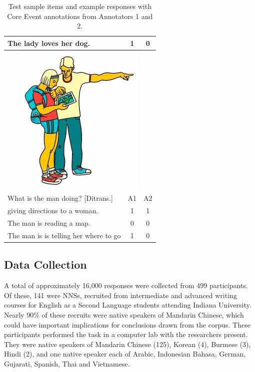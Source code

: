 \documentclass[11pt,a4paper]{article}
\begin{document}
\begin{table}[htb!]
\begin{center}
\begin{tabular}{|l|c|c|}
\hline
The lady loves her dog. & 1 & 0 \\
\hline
\hline
\multicolumn{3}{|c|}{\includegraphics[width=0.5\columnwidth]{figures/I28.jpg}} \\
\hline
What is the man doing? [Ditrans.] & A1 & A2 \\
\hline
giving directions to a woman. & 1 & 1 \\
\hline
The man is reading a map. & 0 & 0 \\
\hline
The man is is telling her where to go & 1 & 0 \\
\hline
\end{tabular}
\caption{\label{tab:test-sample-items} Test sample items and example responses with Core Event annotations from Annotators 1 and 2.}
\end{center}
\end{table}


\subsection{Data Collection}

A total of approximately 16,000 responses were collected from 499 participants. Of these, 141 were NNSs, recruited from intermediate and advanced writing courses for English as a Second Language students attending Indiana University. Nearly 90\% of these recruits were native speakers of Mandarin Chinese, which could have important implications for conclusions drawn from the corpus. These participants performed the task in a computer lab with the researchers present. They were native speakers of Mandarin Chinese (125), Korean (4), Burmese (3), Hindi (2), and one native speaker each of Arabic, Indonesian Bahasa, German, Gujarati, Spanish, Thai and Vietnamese.
\end{document}

